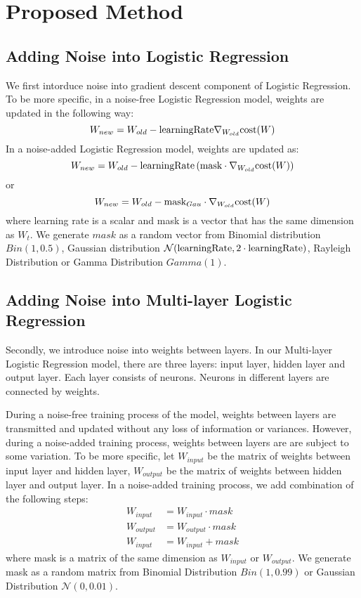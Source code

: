 \section{Proposed Method}
\label{sec:method}



\subsection{Adding Noise into Logistic Regression}
We first intorduce noise into gradient descent component
of Logistic Regression.
To be more specific, in a noise-free Logistic Regression model, weights
are updated in the following way:
\[
W_{new} = W_{old} - \text{learningRate} \nabla_{W_{old}} \text{cost}(W)
\]
In a noise-added Logistic Regression model, weights are updated as:
\[
W_{new}=W_{old}-\text{learningRate} \left(\text{mask} \cdot \nabla_{W_{old}}\text{cost}(W) \right)
\]
or
\[
W_{new} = W_{old} - \text{mask}_{Gau} \cdot \nabla_{W_{old}} \text{cost}(W)
\]
where learning rate is a scalar and mask is a vector that has the same dimension as $W_t$.
We generate $mask$ as a random vector from Binomial distribution
$Bin(1,0.5)$, Gaussian distribution $\mathcal{N}(\text{learningRate}, 2 \cdot \text{learningRate})$,
Rayleigh Distribution or Gamma Distribution $Gamma(1)$.

\subsection{Adding Noise into Multi-layer Logistic Regression}
Secondly, we introduce noise into weights between layers.
In our Multi-layer Logistic Regression model, there are three layers:
input layer, hidden layer and output layer. Each layer consists of
neurons. Neurons in different layers are connected by weights.

During a noise-free training process of the model, weights between layers
are transmitted and updated without any loss of information or variances.
However, during a noise-added training process, weights between layers are
are subject to some variation.
To be more specific, let $W_{input}$ be the matrix of weights between
input layer and hidden layer, $W_{output}$ be the matrix of weights
between hidden layer and output layer. In a noise-added training procoss,
we add combination of the following steps:
\begin{align*}
W_{input} & = W_{input} \cdot mask \\
W_{output} & = W_{output} \cdot mask \\
W_{input} & = W_{input} + mask
\end{align*}
where mask is a matrix of the same dimension as $W_{input}$ or $W_{output}$.
We generate mask as a random matrix from Binomial Distribution
$Bin(1,0.99)$ or Gaussian Distribution $\mathcal{N}(0, 0.01)$.

